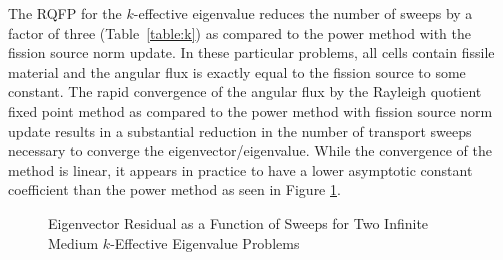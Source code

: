 The RQFP for the $k$-effective eigenvalue reduces the number of sweeps by a factor of three (Table~\ref{table:k}) as compared to the power method with the fission source norm update. In these particular problems, all cells contain fissile material and the angular flux is exactly equal to the fission source to some constant. The rapid convergence of the angular flux by the Rayleigh quotient fixed point method as compared to the power method with fission source norm update results in a substantial reduction in the number of transport sweeps necessary to converge the eigenvector/eigenvalue. While the convergence of the method is linear, it appears in practice to have a lower asymptotic constant coefficient than the power method as seen in Figure \ref{fig:kRes}.

\begin{figure}[t]
	\centering
	\resizebox{!}{0.5\textheight}{
		
	}
	\caption{Eigenvector Residual as a Function of Sweeps for Two Infinite Medium $k$-Effective Eigenvalue Problems}
	\label{fig:kRes}
\end{figure}



